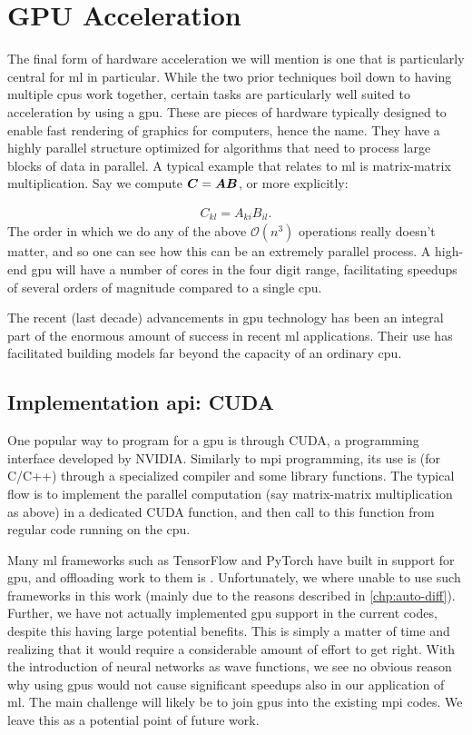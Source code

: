 \documentclass[Thesis.tex]{subfiles}
\begin{document}
\section{GPU Acceleration}

The final form of hardware acceleration we will mention is one that is
particularly central for \gls{ml} in particular. While the two prior techniques boil
down to having multiple \glspl{cpu} work together, certain tasks are particularly well
suited to acceleration by using a \gls{gpu}. These are
pieces of hardware typically designed to enable fast rendering of graphics for
computers, hence the name. They have a highly parallel structure optimized for
algorithms that need to process large blocks of data in parallel. A typical
example that relates to \gls{ml} is matrix-matrix multiplication. Say we compute $\bm{C} = \bm{A} \bm{B}$, or more explicitly:

\begin{align}
  C_{kl} = A_{ki}B_{il}.
\end{align}
The order in which we do any of the above $\mathcal{O}(n^3)$ operations really
doesn't matter, and so one can see how this can be an extremely parallel
process. A high-end \gls{gpu} will have a number of cores in the four digit range,
facilitating speedups of several orders of magnitude compared to a single \gls{cpu}.

The recent (last decade) advancements in \gls{gpu} technology has been an integral
part of the enormous amount of success in recent \gls{ml} applications. Their use has
facilitated building models far beyond the capacity of an ordinary \gls{cpu}.

\subsection{Implementation \acrshort{api}: CUDA}

One popular way to program for a \gls{gpu} is through CUDA, a programming
interface developed by NVIDIA. Similarly to \gls{mpi} programming, its use is (for
C/C++) through a specialized compiler and some library functions. The typical
flow is to implement the parallel computation (say matrix-matrix multiplication
as above) in a dedicated CUDA function, and then call to this function from
regular code running on the \gls{cpu}.

Many \gls{ml} frameworks such as TensorFlow and PyTorch have built in support for \gls{gpu},
and offloading work to them is . Unfortunately, we where unable to
use such frameworks in this work (mainly due to the reasons described in
\cref{chp:auto-diff}). Further, we have not actually implemented \gls{gpu} support in
the current codes, despite this having large potential benefits. This is simply
a matter of time and realizing that it would require a considerable amount of effort
to get right. With the introduction of neural networks as wave functions, we see
no obvious reason why using \glspl{gpu} would not cause significant speedups also in
our application of \gls{ml}. The main challenge will likely be to join
\glspl{gpu} into the existing \gls{mpi} codes. We leave this as a potential point
of future work.
\end{document}
